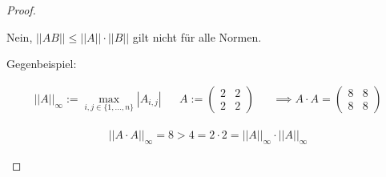 \documentclass[]{article}
\newcommand{\norm}[1]{\left|\left|#1\right|\right|}
\begin{document}
\begin{proof}
\begin{enumerate}[label=\alph*)]
		Nein, $\norm{AB} \leq \norm{A}\cdot \norm{B}$ gilt nicht für alle Normen.
		
		Gegenbeispiel:
		
		\begin{align*}
			\norm{A}_\infty := \max_{i,j\in\{1,...,n\}}|A_{i,j}| &&
			A:= \begin{pmatrix}
				2 & 2\\
				2 & 2
			\end{pmatrix} && \implies A\cdot A = \begin{pmatrix}
				8 & 8\\
				8 & 8
			\end{pmatrix}
		\end{align*}
	
		\begin{align*}
			\norm{A\cdot A}_\infty = 8 > 4 = 2 \cdot 2 = \norm{A}_\infty \cdot \norm{A}_\infty
		\end{align*}
		
	\end{enumerate}
\end{proof}
\end{document}

